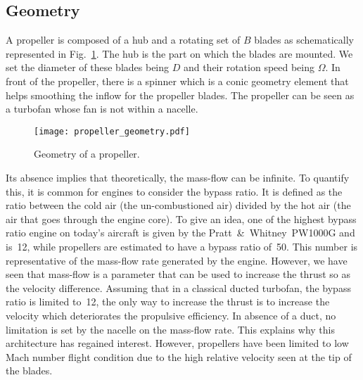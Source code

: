 
\subsection{Geometry}
\label{sub:cror_propeller_geometry}

A propeller is composed of a hub and a rotating set of 
$B$ blades as schematically represented in
Fig.~\ref{fig:cror_propeller_geometry}. The hub
is the part on which the blades are mounted.
We set the diameter of these blades being $D$
and their rotation speed being $\Omega$. 
In front of the propeller, there is a spinner which is
a conic geometry element that helps
smoothing the inflow for the propeller blades.
The propeller can be seen as
a turbofan whose fan is not within a nacelle.
\begin{figure}[htb]
  \centering
  \texttt{[image: propeller\_geometry.pdf]}
  \caption{Geometry of a propeller.}
  \label{fig:cror_propeller_geometry}
\end{figure}
Its absence implies that theoretically, the mass-flow can be
infinite. To quantify this, it is common for engines to
consider the bypass ratio. It is defined as the ratio between the
cold air (the un-combustioned air)
divided by the hot air (the air that goes through the engine core).
To give an idea, one of the highest bypass ratio engine on today's aircraft is given
by the Pratt~\&~Whitney~PW1000G and is~12, while propellers are estimated
to have a bypass ratio of~50. 
This number is representative of the mass-flow rate generated by the engine.
However, we have seen that mass-flow is a parameter that can be used to increase
the thrust so as the velocity difference. Assuming that in a classical ducted turbofan, 
the bypass ratio is limited to~12, the only
way to increase the thrust is to increase the 
velocity which deteriorates the propulsive efficiency. In absence of a duct,
no limitation is set by the nacelle on the mass-flow rate.
This explains why this architecture has
regained interest. However, propellers
have been limited to low Mach number flight condition
due to the high relative velocity seen at the tip of the blades.

